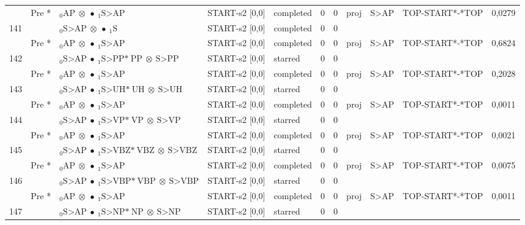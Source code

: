\documentclass[10pt]{article}
\begin{document}
\begin{longtable}[htbp]{lllllllllll}
 & Pre *& $ {}_0 \textrm{AP} \  \otimes \  \bullet \ {}_{1} \textrm{S>AP} $ & START-s2 [0,0] & completed & 0 & 0 & proj & S>AP & TOP-START*-*TOP & 0,0279 \\ 
141 & & $ {}_0 \textrm{S>AP} \  \otimes \  \bullet \ {}_{1} \textrm{S} $ & START-s2 [0,0] & completed & 0 & 0 & & & & \\ 
 & Pre *& $ {}_0 \textrm{AP} \  \otimes \  \bullet \ {}_{1} \textrm{S>AP} $ & START-s2 [0,0] & completed & 0 & 0 & proj & S>AP & TOP-START*-*TOP & 0,6824 \\ 
142 & & $ {}_0 \textrm{S>AP} \  \bullet \ {}_{1} \textrm{S>PP*} \ \textrm{PP} \  \otimes \ \textrm{S>PP} $ & START-s2 [0,0] & starred & 0 & 0 & & & & \\ 
 & Pre *& $ {}_0 \textrm{AP} \  \otimes \  \bullet \ {}_{1} \textrm{S>AP} $ & START-s2 [0,0] & completed & 0 & 0 & proj & S>AP & TOP-START*-*TOP & 0,2028 \\ 
143 & & $ {}_0 \textrm{S>AP} \  \bullet \ {}_{1} \textrm{S>UH*} \ \textrm{UH} \  \otimes \ \textrm{S>UH} $ & START-s2 [0,0] & starred & 0 & 0 & & & & \\ 
 & Pre *& $ {}_0 \textrm{AP} \  \otimes \  \bullet \ {}_{1} \textrm{S>AP} $ & START-s2 [0,0] & completed & 0 & 0 & proj & S>AP & TOP-START*-*TOP & 0,0011 \\ 
144 & & $ {}_0 \textrm{S>AP} \  \bullet \ {}_{1} \textrm{S>VP*} \ \textrm{VP} \  \otimes \ \textrm{S>VP} $ & START-s2 [0,0] & starred & 0 & 0 & & & & \\ 
 & Pre *& $ {}_0 \textrm{AP} \  \otimes \  \bullet \ {}_{1} \textrm{S>AP} $ & START-s2 [0,0] & completed & 0 & 0 & proj & S>AP & TOP-START*-*TOP & 0,0021 \\ 
145 & & $ {}_0 \textrm{S>AP} \  \bullet \ {}_{1} \textrm{S>VBZ*} \ \textrm{VBZ} \  \otimes \ \textrm{S>VBZ} $ & START-s2 [0,0] & starred & 0 & 0 & & & & \\ 
 & Pre *& $ {}_0 \textrm{AP} \  \otimes \  \bullet \ {}_{1} \textrm{S>AP} $ & START-s2 [0,0] & completed & 0 & 0 & proj & S>AP & TOP-START*-*TOP & 0,0075 \\ 
146 & & $ {}_0 \textrm{S>AP} \  \bullet \ {}_{1} \textrm{S>VBP*} \ \textrm{VBP} \  \otimes \ \textrm{S>VBP} $ & START-s2 [0,0] & starred & 0 & 0 & & & & \\ 
 & Pre *& $ {}_0 \textrm{AP} \  \otimes \  \bullet \ {}_{1} \textrm{S>AP} $ & START-s2 [0,0] & completed & 0 & 0 & proj & S>AP & TOP-START*-*TOP & 0,0011 \\ 
147 & & $ {}_0 \textrm{S>AP} \  \bullet \ {}_{1} \textrm{S>NP*} \ \textrm{NP} \  \otimes \ \textrm{S>NP} $ & START-s2 [0,0] & starred & 0 & 0 & & & & \\ 

\end{longtable}
\end{document}
